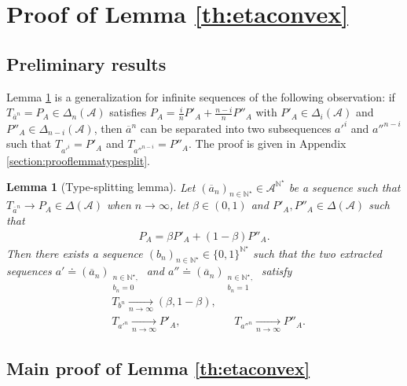 \documentclass[conference,a4paper]{IEEEtran}
\newtheorem{lemma}{Lemma}
\begin{document}
\section{Proof of Lemma \ref{th:etaconvex}}\label{section:proofetaconvex}

\subsection{Preliminary results}

Lemma \ref{lemma:typesplit} is a generalization for infinite sequences of the following observation: if $T_{\overline{a}^n} = P_A \in \Delta_n(\mathcal{A})$ satisfies $P_A = \frac{i}{n}P'_A + \frac{n-i}{n}P''_A$ with $P'_A \in \Delta_i(\mathcal{A})$ and $P''_A \in \Delta_{n-i}(\mathcal{A})$, then $\overline{a}^n$ can be separated into two subsequences $a'^i$ and $a''^{n-i}$ such that $T_{a'^i} = P'_A$ and $T_{a''^{n-i}} = P''_A$. The proof is given in Appendix \ref{section:prooflemmatypesplit}.

\begin{lemma}[Type-splitting lemma]\label{lemma:typesplit}
    Let $(\overline{a}_n)_{n \in \mathbb{N}^\star} \in \mathcal{A}^{\mathbb{N}^\star}$ be a sequence such that $T_{\overline{a}^n} \rightarrow P_A \in \Delta(\mathcal{A})$ when $n \rightarrow \infty$, let $\beta \in (0,1)$ and $P'_A, P''_A \in \Delta(\mathcal{A})$ such that
    \begin{align}
        P_A = \beta P'_A + (1-\beta)P''_A.
    \end{align}
    Then there exists a sequence $(b_n)_{n \in \mathbb{N}^\star} \in \lbrace 0, 1 \rbrace^{\mathbb{N}^\star}$ such that the two extracted sequences $a' \doteq (\overline{a}_n)_{\substack{n\in \mathbb{N}^\star, \\ b_n = 0}}$ and $a'' \doteq (\overline{a}_n)_{\substack{n\in \mathbb{N}^\star, \\ b_n = 1}}$ satisfy
    \begin{align}
        & T_{b^n} \underset{n \rightarrow \infty}{\rightarrow} (\beta, 1-\beta), & & \\
        & T_{a'^n} \underset{n \rightarrow \infty}{\rightarrow} P'_A, & & T_{a''^n} \underset{n \rightarrow \infty}{\rightarrow} P''_A.
    \end{align}
\end{lemma}

\subsection{Main proof of Lemma \ref{th:etaconvex}}
\end{document}
